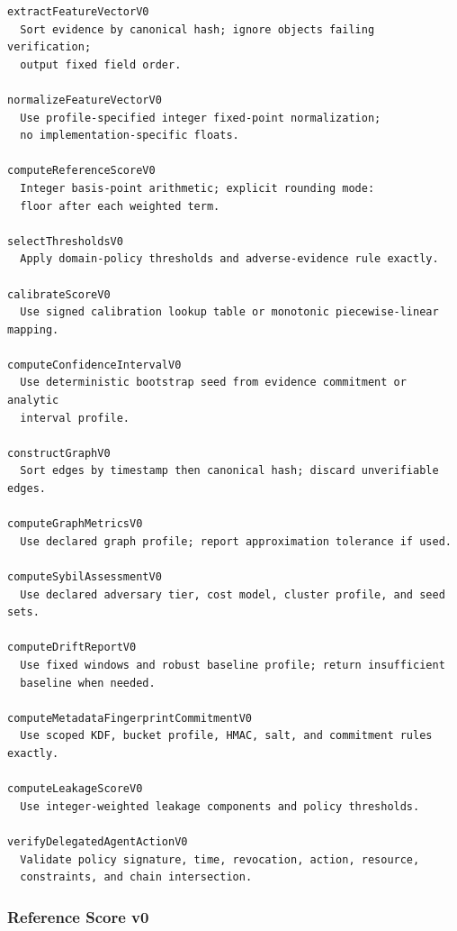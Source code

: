 \documentclass[11pt]{article}
\begin{document}
\begin{lstlisting}[style=tslcode]
extractFeatureVectorV0
  Sort evidence by canonical hash; ignore objects failing verification;
  output fixed field order.

normalizeFeatureVectorV0
  Use profile-specified integer fixed-point normalization;
  no implementation-specific floats.

computeReferenceScoreV0
  Integer basis-point arithmetic; explicit rounding mode:
  floor after each weighted term.

selectThresholdsV0
  Apply domain-policy thresholds and adverse-evidence rule exactly.

calibrateScoreV0
  Use signed calibration lookup table or monotonic piecewise-linear mapping.

computeConfidenceIntervalV0
  Use deterministic bootstrap seed from evidence commitment or analytic
  interval profile.

constructGraphV0
  Sort edges by timestamp then canonical hash; discard unverifiable edges.

computeGraphMetricsV0
  Use declared graph profile; report approximation tolerance if used.

computeSybilAssessmentV0
  Use declared adversary tier, cost model, cluster profile, and seed sets.

computeDriftReportV0
  Use fixed windows and robust baseline profile; return insufficient
  baseline when needed.

computeMetadataFingerprintCommitmentV0
  Use scoped KDF, bucket profile, HMAC, salt, and commitment rules exactly.

computeLeakageScoreV0
  Use integer-weighted leakage components and policy thresholds.

verifyDelegatedAgentActionV0
  Validate policy signature, time, revocation, action, resource,
  constraints, and chain intersection.
\end{lstlisting}


\subsubsection{Reference Score v0}
\end{document}
